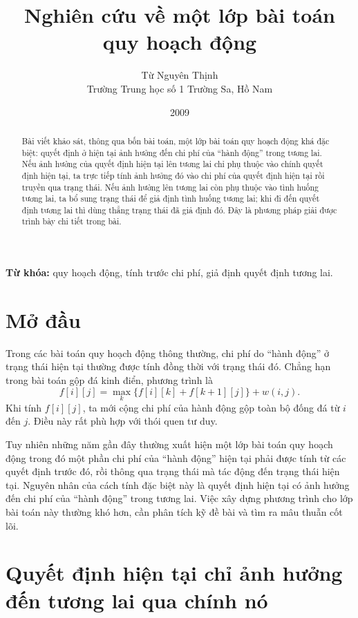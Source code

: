 \documentclass[11pt]{article}
\title{Nghiên cứu về một lớp bài toán quy hoạch động}
\author{Từ Nguyên Thịnh\\Trường Trung học số 1 Trường Sa, Hồ Nam}
\date{2009}
\begin{document}
\maketitle


\begin{abstract}
Bài viết khảo sát, thông qua bốn bài toán, một lớp bài toán quy hoạch động khá
đặc biệt: quyết định ở hiện tại ảnh hưởng đến chi phí của ``hành động'' trong
tương lai. Nếu ảnh hưởng của quyết định hiện tại lên tương lai chỉ phụ thuộc
vào chính quyết định hiện tại, ta trực tiếp tính ảnh hưởng đó vào chi phí của
quyết định hiện tại rồi truyền qua trạng thái. Nếu ảnh hưởng lên tương lai còn
phụ thuộc vào tình huống tương lai, ta bổ sung trạng thái để giả định tình
huống tương lai; khi đi đến quyết định tương lai thì dùng thẳng trạng thái đã
giả định đó. Đây là phương pháp giải được trình bày chi tiết trong bài.
\end{abstract}

\noindent\textbf{Từ khóa:} quy hoạch động, tính trước chi phí, giả định quyết
định tương lai.

\section{Mở đầu}

Trong các bài toán quy hoạch động thông thường, chi phí do ``hành động'' ở
trạng thái hiện tại thường được tính đồng thời với trạng thái đó. Chẳng hạn
trong bài toán gộp đá kinh điển, phương trình là
\[
  f[i][j]=\max_k\{f[i][k]+f[k+1][j]\}+w(i,j).
\]
Khi tính $f[i][j]$, ta mới cộng chi phí của hành động gộp toàn bộ đống đá từ
$i$ đến $j$. Điều này rất phù hợp với thói quen tư duy.

Tuy nhiên những năm gần đây thường xuất hiện một lớp bài toán quy hoạch động
trong đó một phần chi phí của ``hành động'' hiện tại phải được tính từ các
quyết định trước đó, rồi thông qua trạng thái mà tác động đến trạng thái hiện
tại. Nguyên nhân của cách tính đặc biệt này là quyết định hiện tại có ảnh
hưởng đến chi phí của ``hành động'' trong tương lai. Việc xây dựng phương trình
cho lớp bài toán này thường khó hơn, cần phân tích kỹ đề bài và tìm ra mâu
thuẫn cốt lõi.

\section{Quyết định hiện tại chỉ ảnh hưởng đến tương lai qua chính nó}
\end{document}
